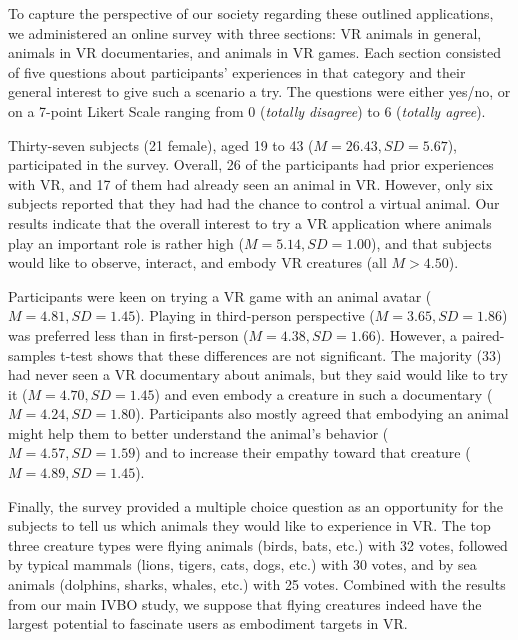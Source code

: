 \documentclass[conference]{IEEEtran}
\begin{document}
To capture the perspective of our society regarding these outlined applications, we administered an online survey with three sections: VR animals in general, animals in VR documentaries, and animals in VR games. Each section consisted of five questions about participants' experiences in that category and their general interest to give such a scenario a try. The questions were either yes/no, or on a 7-point Likert Scale ranging from 0 (\textit{totally disagree}) to 6 (\textit{totally agree}).

Thirty-seven subjects (21 female), aged 19 to 43 ($M = 26.43, SD = 5.67$), participated in the survey. Overall, 26 of the participants had prior experiences with VR, and 17 of them had already seen an animal in VR. However, only six subjects reported that they had had the chance to control a virtual animal. Our results indicate that the overall interest to try a VR application where animals play an important role is rather high ($M = 5.14, SD = 1.00$), and that subjects would like to observe, interact, and embody VR creatures (all $M > 4.50$).

Participants were keen on trying a VR game with an animal avatar ($M = 4.81, SD = 1.45$). Playing in third-person perspective ($M = 3.65, SD = 1.86$) was preferred less than in first-person ($M = 4.38, SD = 1.66$). However, a paired-samples t-test shows that these differences are not significant. The majority (33) had never seen a VR documentary about animals, but they said would like to try it ($M = 4.70, SD = 1.45$) and even embody a creature in such a documentary ($M = 4.24, SD = 1.80$). Participants also mostly agreed that embodying an animal might help them to better understand the animal's behavior ($M = 4.57, SD = 1.59$) and to increase their empathy toward that creature ($M = 4.89, SD = 1.45$).

Finally, the survey provided a multiple choice question as an opportunity for the subjects to tell us which animals they would like to experience in VR. The top three creature types were flying animals (birds, bats, etc.) with 32 votes, followed by typical mammals (lions, tigers, cats, dogs, etc.) with 30 votes, and by sea animals (dolphins, sharks, whales, etc.) with 25 votes. Combined with the results from our main IVBO study, we suppose that flying creatures indeed have the largest potential to fascinate users as embodiment targets in VR.




\end{document}
